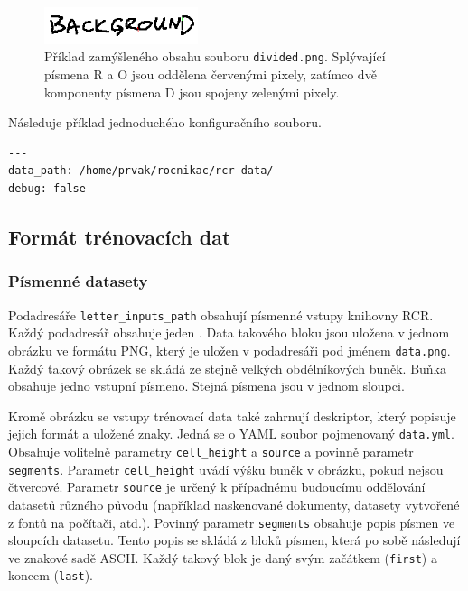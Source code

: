 \documentclass[a4paper]{article}
\begin{document}
\begin{figure}[h]
	\centering
	\includegraphics[width=0.4\textwidth]{divided_sample}
	\caption{Příklad zamýšleného obsahu souboru
	\texttt{divided.png}. Splývající písmena R a O jsou
	oddělena červenými pixely, zatímco dvě komponenty
	písmena D jsou spojeny zelenými pixely.}
\end{figure}

Následuje příklad jednoduchého konfiguračního souboru.
\begin{lstlisting}
---
data_path: /home/prvak/rocnikac/rcr-data/
debug: false
\end{lstlisting}

\subsection{Formát trénovacích dat}
\subsubsection{Písmenné datasety}
Podadresáře \texttt{letter\_inputs\_path} obsahují písmenné vstupy knihovny RCR.
Každý podadresář obsahuje jeden . Data takového bloku jsou uložena v jednom obrázku ve formátu PNG,
který je uložen v podadresáři  pod jménem \texttt{data.png}.
Každý takový obrázek se skládá ze stejně velkých obdélníkových buněk. Buňka
obsahuje jedno vstupní písmeno. Stejná písmena jsou v jednom sloupci.

Kromě obrázku se vstupy trénovací data také zahrnují deskriptor, který popisuje
jejich formát a uložené znaky. Jedná se o YAML soubor pojmenovaný
\texttt{data.yml}. Obsahuje volitelně parametry \texttt{cell\_height} a
\texttt{source} a povinně parametr \texttt{segments}.
Parametr \texttt{cell\_height} uvádí výšku buněk v obrázku, pokud nejsou
čtvercové. Parametr \texttt{source} je určený k případnému budoucímu oddělování
datasetů různého původu (například naskenované dokumenty, datasety vytvořené
z fontů na počítači, atd.).
Povinný parametr \texttt{segments} obsahuje popis písmen ve sloupcích datasetu.
Tento popis se skládá z bloků písmen, která po sobě následují ve znakové sadě
ASCII. Každý takový blok je daný svým začátkem (\texttt{first}) a koncem
(\texttt{last}).
\end{document}
